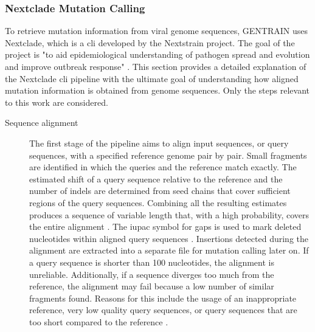 \subsubsection{Nextclade Mutation Calling}
\label{sec:nextclade}
To retrieve mutation information from viral genome sequences, GENTRAIN uses Nextclade, which is a \acrfull{cli} developed by the Nextstrain project. The goal of the project is "to aid epidemiological understanding of pathogen spread and evolution and improve outbreak response" \cite{Nex2}. This section provides a detailed explanation of the Nextclade \acrfull{cli} pipeline with the ultimate goal of understanding how aligned mutation information is obtained from genome sequences. Only the steps relevant to this work are considered.

\begin{description}
    \item[Sequence alignment] The first stage of the pipeline aims to align input sequences, or query sequences, with a specified reference genome pair by pair. Small fragments are identified in which the queries and the reference match exactly. The estimated shift of a query sequence relative to the reference and the number of indels are determined from seed chains that cover sufficient regions of the query sequences. Combining all the resulting estimates produces a sequence of variable length that, with a high probability, covers the entire alignment \cite{Nex3}. The \acrshort{iupac} symbol for gaps is used to mark deleted nucleotides within aligned query sequences \cite{Nex5}. Insertions detected during the alignment are extracted into a separate file for mutation calling later on. If a query sequence is shorter than 100 nucleotides, the alignment is unreliable. Additionally, if a sequence diverges too much from the reference, the alignment may fail because a low number of similar fragments found. Reasons for this include the usage of an inappropriate reference, very low quality query sequences, or query sequences that are too short compared to the reference \cite{Nex3}.

\end{description}
